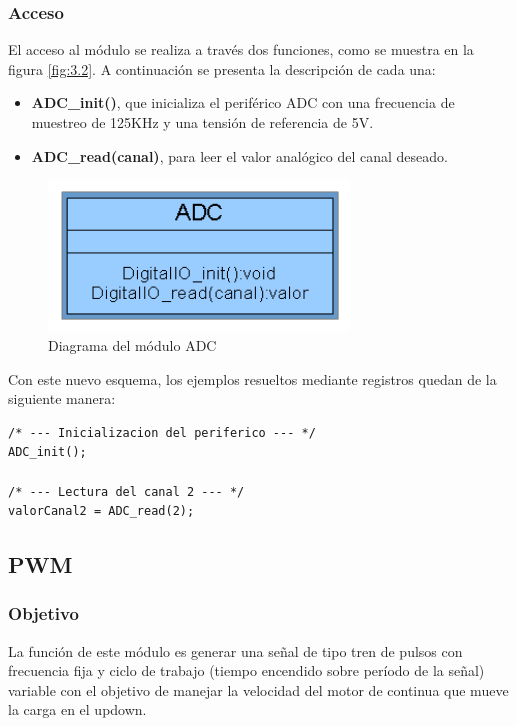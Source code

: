 \subsubsection{Acceso}

El acceso al módulo se realiza a través dos funciones, como se muestra en la figura \ref{fig:3.2}. A continuación se presenta la descripción de cada una:
\begin{itemize}
	\item \textbf{ADC\_init()}, que inicializa el periférico ADC con una frecuencia de muestreo de 125KHz y una tensión de referencia de 5V.
	\item \textbf{ADC\_read(canal)}, para leer el valor analógico del canal deseado.
\end{itemize}

\begin{figure}[!ht]
	\centering
	\includegraphics[width=8cm,scale=1]{resources/3_2-moduloADC.png}
	\caption{Diagrama del módulo ADC}
	\label{fig:\thefigure}
\end{figure}

Con este nuevo esquema, los ejemplos resueltos mediante registros quedan de la siguiente manera:

\begin{lstlisting}[style=CStyle]
/* --- Inicializacion del periferico --- */
ADC_init(); 

/* --- Lectura del canal 2 --- */
valorCanal2 = ADC_read(2);
\end{lstlisting}



\subsection{PWM}
\subsubsection{Objetivo}
La función de este módulo es generar una señal de tipo tren de pulsos con frecuencia fija y ciclo de trabajo (tiempo encendido sobre período de la señal) variable con el objetivo de manejar la velocidad del motor de continua que mueve la carga en el updown.

